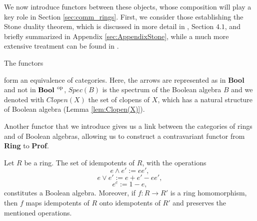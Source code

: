 We now introduce functors between these objects, whose composition will play a key role in Section \ref{sec:comm_rings}. First, we consider those establishing the Stone duality theorem, which is discussed in more detail in \cite{borceux2001galois}, Section $4.1$, and briefly summarized in Appendix \ref{sec:AppendixStone}, while a much more extensive treatment can be found in \cite{johnstone1982stone}.
\begin{theorem}
    The functors
    \begin{center}
    \end{center}
    form an equivalence of categories. Here, the arrows are represented as in \textbf{Bool} and not in ${\textbf{Bool }}^{\mathrm{op}}$, $Spec(B)$ is the spectrum of the Boolean algebra $B$ and we denoted with $Clopen(X)$ the set of clopens of $X$, which has a natural structure of Boolean algebra (Lemma \ref{lem:Clopen(X)}). 
\end{theorem}

Another functor that we introduce gives us a link between the categories of rings and of Boolean algebras, allowing us to construct a contravariant functor from \textbf{Ring} to \textbf{Prof}.
\begin{proposition}
    Let $R$ be a ring. The set of idempotents of $R$, with the operations
    \[ e\wedge e':= ee', \]
    \[ e\vee e':= e + e' - ee', \]
    \[ e^c := 1 - e, \]
    constitutes a Boolean algebra. Moreover, if $f:R\to R'$ is a ring homomorphism, then $f$ maps idempotents of $R$ onto idempotents of $R'$ and preserves the mentioned operations.
\end{proposition}

